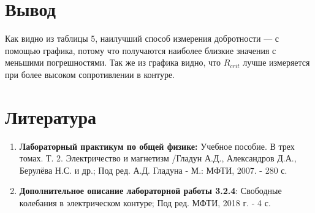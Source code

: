 \documentclass[a4paper, 12pt]{article}%
\begin{document}
\section*{Вывод}
Как видно из таблицы 5, наилучший способ измерения добротности --- с помощью графика, потому что получаются наиболее близкие значения с меньшими погрешностями. Так же из графика видно, что $R_{crit}$ лучше измеряется при более высоком сопротивлении в контуре. 

\section*{Литература}
\begin{enumerate}
\item \textbf{Лабораторный практикум по общей физике:} Учебное пособие. В трех томах. Т. 2. Электричество и магнетизм /Гладун А.Д., Александров Д.А., Берулёва Н.С. и др.; Под ред. А.Д. Гладуна - М.: МФТИ, 2007. - 280 с.
\item \textbf{Дополнительное описание лабораторной работы 3.2.4}: Свободные колебания в электрическом контуре; Под ред. МФТИ, 2018 г. - 4 с.
\end{enumerate}
\end{document}
